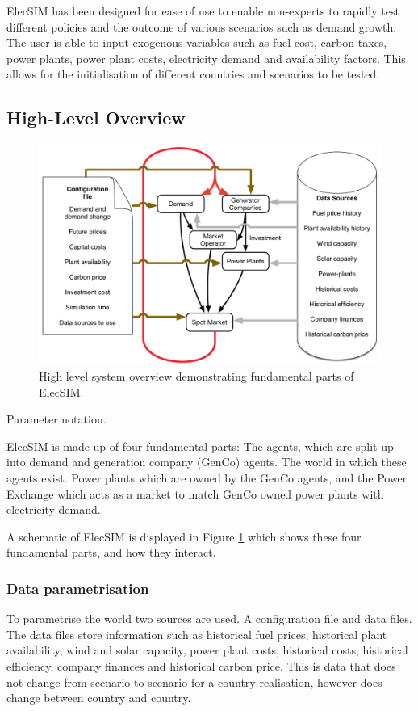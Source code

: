 
ElecSIM has been designed for ease of use to enable non-experts to rapidly test different policies and the outcome of various scenarios such as demand growth. The user is able to input exogenous variables such as fuel cost, carbon taxes, power plants, power plant costs, electricity demand and availability factors. This allows for the initialisation of different countries and scenarios to be tested.


\subsection{High-Level Overview}

\begin{figure}
	\centering
	\includegraphics[width=0.97\linewidth]{figures/System_overview}
	\caption{High level system overview demonstrating fundamental parts of ElecSIM.}
	\label{fig:systemoverview}
\end{figure}


\begin{table}[h]
	\centering
	\caption{Parameter notation.}
\end{table}


ElecSIM is made up of four fundamental parts: The agents, which are split up into demand and generation company (GenCo) agents. The world in which these agents exist. Power plants which are owned by the GenCo agents, and the Power Exchange which acts as a market to match GenCo owned power plants with electricity demand.

A schematic of ElecSIM is displayed in Figure \ref{fig:systemoverview} which shows these four fundamental parts, and how they interact.

\subsubsection{Data parametrisation} To parametrise the world two sources are used. A configuration file and data files. The data files store information such as historical fuel prices, historical plant availability, wind and solar capacity, power plant costs, historical costs, historical efficiency, company finances and historical carbon price. This is data that does not change from scenario to scenario for a country realisation, however does change between country and country.

